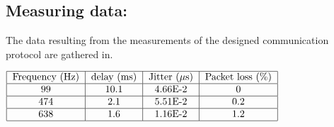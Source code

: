 \subsection*{Measuring data:}
The data resulting from the measurements of the designed communication protocol are
gathered in.
\begin{center}
  $\begin{tabular}{|c|c|c|c|c|}
    \hline
    \text{Frequency (Hz)} & \text{delay (ms)} & \text{Jitter ($\mu$s)} & \text{Packet loss (\%)}\\
    \hline
    99 & 10.1 & 4.66E-2 & 0 \\
    \hline
    474 & 2.1 & 5.51E-2 & 0.2 \\
    \hline
    638 & 1.6 & 1.16E-2 & 1.2 \\
    \hline
  \end{tabular}$
    \label{tab:udp_appendix}
    
\end{center}
% 	
% 	    
% 	    
% 	    
% 	    
% 	    


